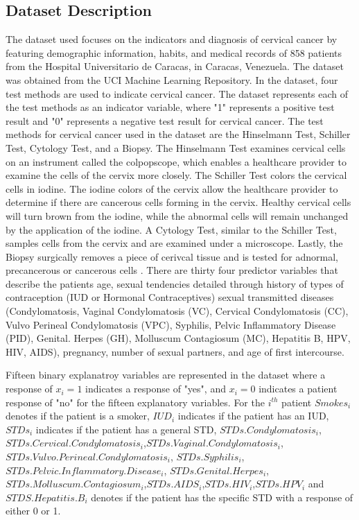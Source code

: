 \documentclass[12pt]{article}
\numberwithin{equation}{section}
\begin{document}
\subsection{Dataset Description} 
The dataset used focuses on the indicators and diagnosis of cervical cancer by featuring demographic information, habits, and medical records of 858 patients from the Hospital Universitario de Caracas, in Caracas, Venezuela. The dataset was obtained from the UCI Machine Learning Repository\cite{UCI}. In the dataset, four test methods are used to indicate cervical cancer. The dataset represents each of the test methods as an indicator variable, where "1" represents a positive test result and "0" represents a negative test result for cervical cancer. The test methods for cervical cancer used in the dataset are the Hinselmann Test, Schiller Test, Cytology Test, and a Biopsy. The Hinselmann Test examines cervical cells on an instrument called the colpopscope, which enables a healthcare provider to examine the cells of the cervix more closely. The Schiller Test colors the cervical cells in iodine. The iodine colors of the cervix allow the healthcare provider to determine if there are cancerous cells forming in the cervix. Healthy cervical cells will turn brown from the iodine, while the abnormal cells will remain unchanged by the application of the iodine. A Cytology Test, similar to the Schiller Test, samples cells from the cervix and are examined under a microscope. Lastly, the Biopsy surgically removes a piece of cerivcal tissue and is tested for adnormal, precancerous or cancerous cells \cite{Tests}.  There are thirty four predictor variables that describe the patients age, sexual tendencies detailed through history of types of contraception (IUD or Hormonal Contraceptives) sexual transmitted diseases (Condylomatosis, Vaginal Condylomatosis (VC), Cervical Condylomatosis (CC), Vulvo Perineal Condylomatosis (VPC), Syphilis, Pelvic Inflammatory Disease (PID), Genital. Herpes (GH), Molluscum Contagiosum (MC), Hepatitis B, HPV, HIV, AIDS), pregnancy, number of sexual partners, and age of first intercourse. 

Fifteen binary explanatroy variables are represented in the dataset where a response of $x_i=1$ indicates a response of "yes", and  $x_i = 0$ indicates a patient response of "no" for the fifteen explanatory variables. For the $i^{th}$ patient $Smokes_i$ denotes if the patient is a smoker, $IUD_i$ indicates if the patient has an IUD, $STDs_i$ indicates if the patient has a general STD, $STDs.Condylomatosis_i$, $STDs.Cervical.Condylomatosis_i$,$ STDs.Vaginal.Condylomatosis_i$, $STDs.Vulvo.Perineal.Condylomatosis_i$, $STDs.Syphilis_i$,$STDs.Pelvic.Inflammatory.Disease_i$, $STDs.Genital.Herpes_i$, $STDs.Molluscum.Contagiosum_i$,$STDs.AIDS_i$,$STDs.HIV_i$,$STDs.HPV_i$ and $STDS.Hepatitis.B_i$ denotes if the patient has the specific STD with a response of either 0 or 1. 
\end{document}
